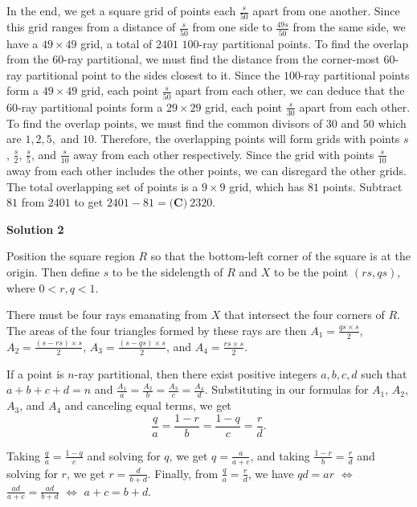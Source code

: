 \begin{enumerate}
 In the end, we get a square grid of points each $\frac s{50}$ apart from one another. Since this grid ranges from a distance of $\frac s{50}$ from one side to $\frac{49s}{50}$ from the same side, we have a $49\times49$ grid, a total of $2401$ $100$-ray partitional points. To find the overlap from the $60$-ray partitional, we must find the distance from the corner-most $60$-ray partitional point to the sides closest to it. Since the $100$-ray partitional points form a $49\times49$ grid, each point $\frac s{50}$ apart from each other, we can deduce that the $60$-ray partitional points form a $29\times29$ grid, each point $\frac s{30}$ apart from each other. To find the overlap points, we must find the common divisors of $30$ and $50$ which are $1, 2, 5,$ and $10$. Therefore, the overlapping points will form grids with points $s$, $\frac s{2}$, $\frac s{5}$, and $\frac s{10}$ away from each other respectively. Since the grid with points $\frac s{10}$ away from each other includes the other points, we can disregard the other grids. The total overlapping set of points is a $9\times9$ grid, which has $81$ points. Subtract $81$ from $2401$ to get $2401-81=\boxed{\textbf{(C)}\ 2320}$.

 



\textbf{Solution 2}

Position the square region $R$ so that the bottom-left corner of the square is at the origin. Then define $s$ to be the sidelength of $R$ and $X$ to be the point $(rs, qs)$, where $0<r,q<1$. 

 
There must be four rays emanating from $X$ that intersect the four corners of $R$. The areas of the four triangles formed by these rays are then $A_1=\frac{qs\times s}{2}$, $A_2=\frac{(s-rs)\times s}{2}$, $A_3=\frac{(s-qs)\times s}{2}$, and $A_4=\frac{rs\times s}{2}$. 

 
If a point is $n$-ray partitional, then there exist positive integers $a, b, c, d$ such that $a+b+c+d=n$ and $\frac{A_1}{a}=\frac{A_2}{b}=\frac{A_3}{c}=\frac{A_4}{d}$. Substituting in our formulas for $A_1$, $A_2$, $A_3$, and $A_4$ and canceling equal terms, we get 
 \[\frac{q}{a}=\frac{1-r}{b}=\frac{1-q}{c}=\frac{r}{d}.\] 

 
Taking $\frac{q}{a}=\frac{1-q}{c}$ and solving for $q$, we get $q=\frac{a}{a+c}$, and taking $\frac{1-r}{b}=\frac{r}{d}$ and solving for $r$, we get $r=\frac{d}{b+d}$. Finally, from $\frac{q}{a}=\frac{r}{d}$, we have $qd=ar$ $\Leftrightarrow$ $\frac{ad}{a+c}=\frac{ad}{b+d}$ $\Leftrightarrow$ $a+c=b+d$. 


\end{enumerate}
